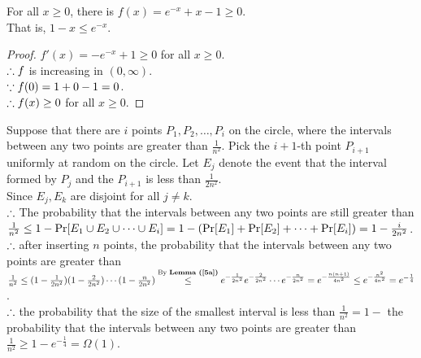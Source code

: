 \begin{pr}
\begin{lm}\label{5a}
For all $x\geq0$, there is $f(x)=e^{-x}+x-1\geq0$.\\
That is, $1-x\leq e^{-x}$.
\begin{proof}
$f'(x)=-e^{-x}+1\geq0$ for all $x\geq0$.\\
$\so f$ is increasing in $(0, \infty)$.\\
$\cuz f(0)=1+0-1=0$.\\
$\so f(x)\geq0$ for all $x\geq0$.
\end{proof}
\end{lm}
Suppose that there are $i$ points $P_1, P_2, \dots, P_i$ on the circle, where the intervals between any two points are greater than $\frac1{n^2}$. Pick the $i+1$-th point $P_{i+1}$ uniformly at random on the circle. Let $E_j$ denote the event that the interval formed by $P_j$ and the $P_{i+1}$ is less than $\frac1{2n^2}$.\\
Since $E_j, E_k$ are disjoint for all $j\neq k$.\\
$\so$ The probability that the intervals between any two points are still greater than $\frac1{n^2}\leq1-\P[E_1\cup E_2\cup\cdots\cup E_i]=1-(\P[E_1]+\P[E_2]+\cdots+\P[E_i])=1-\frac i{2n^2}$.\\
$\so$ after inserting $n$ points, the probability that the intervals between any two points are greater than $\frac1{n^2}\leq(1-\frac1{2n^2})(1-\frac2{2n^2})\cdots(1-\frac n{2n^2})\overtext{By \rflm{5a}}\leq e^{-\frac1{2n^2}}e^{-\frac2{2n^2}}\cdots e^{-\frac n{2n^2}}=e^{-\frac{n(n+1)}{4n^2}}\leq e^{-\frac{n^2}{4n^2}}=e^{-\frac14}$.\\
$\so$ the probability that the size of the smallest interval is less than $\frac1{n^2}=1-$ the probability that the intervals between any two points are greater than $\frac1{n^2}\geq1-e^{-\frac14}=\Omega(1)$.
\end{pr}
